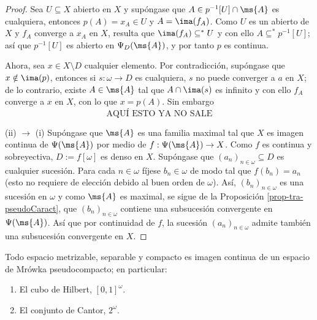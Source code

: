 \begin{proof}
	Sea $U \subseteq X$ abierto en $X$ y supóngase que $A \in p^{-1}[U] \cap \ms{A}$ es cualquiera, entonces $p(A)=x_A \in U$ y $A=\ima(f_A)$. Como $U$ es un abierto de $X$ y $f_A$ converge a $x_A$ en $X$, resulta que $\ima(f_A) \subseteq^* U$ y con ello $A \subseteq^* p^{-1}[U]$; así que $p^{-1}[U]$ es abierto en $\Psi_D(\ms{A})$, y por tanto $p$ es continua.
	
	Ahora, sea $x \in X \setminus D$ cualquier elemento. Por contradicción, supóngase que $x \notin \ima(p)$, entonces si $s:\omega \to D$ es cualquiera, $s$ no puede converger a $a$ en $X$; de lo contrario, existe $A \in \ms{A}$ tal que $A \cap \ima(s)$ es infinito y con ello $f_A$ converge a $x$ en $X$, con lo que $x=p(A)$. Sin embargo 
	$$ \text{AQUÍ ESTO YA NO SALE} $$

	(ii) $\to$ (i) Supóngase que $\ms{A}$ es una familia maximal tal que $X$ es imagen continua de $\Psi(\ms{A})$ por medio de $f:\Psi(\ms{A}) \to X$. Como $f$ es continua y sobreyectiva, $D:=f[\omega]$ es denso en $X$. Supóngase que $(a_n)_{n \in \omega} \subseteq D$ es cualquier sucesión. Para cada $n \in \omega$ fíjese $b_n \in \omega$ de modo tal que $f(b_n)=a_n$ (esto no requiere de elección debido al buen orden de $\omega$). Así, $(b_n)_{n \in \omega}$ es una sucesión en $\omega$ y como $\ms{A}$ es maximal, se sigue de la Proposición \ref{prop-tra-pseudoCaract}, que $(b_n)_{n \in \omega}$ contiene una subsucesión convergente en $\Psi(\ms{A})$. Así que por continuidad de $f$, la sucesión $(a_n)_{n \in \omega}$ admite también una subsucesión convergente en $X$.
	\end{proof}
	
	\begin{corolario}
		Todo espacio metrizable, separable y compacto es imagen continua de un espacio de Mrówka pseudocompacto; en particular:
		\begin{enumerate}
			\item El cubo de Hilbert, $[0,1]^\omega$.
			\item El conjunto de Cantor, $2^\omega$.
		\end{enumerate}
	\end{corolario}